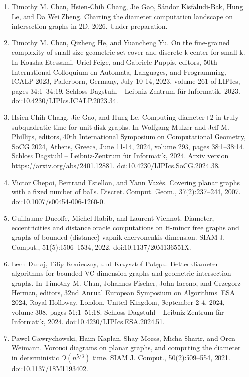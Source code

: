 \begin{enumerate}
\item[]  [9]  Timothy M. Chan, Hsien-Chih Chang, Jie Gao, Sándor Kisfaludi-Bak, Hung Le, and Da Wei Zheng.  Charting the diameter computation landscape on intersection graphs in 2D, 2026.  Under preparation.  
\item[]  [10]  Timothy M. Chan, Qizheng He, and Yuancheng Yu.  On the fine-grained complexity of small-size geometric set cover and discrete k-center for small k.  In Kousha Etessami, Uriel Feige, and Gabriele Puppis, editors, 50th International Colloquium on Automata, Languages, and Programming, ICALP 2023, Paderborn, Germany, July 10-14, 2023, volume 261 of LIPIcs, pages 34:1–34:19. Schloss Dagstuhl – Leibniz-Zentrum für Informatik, 2023.  doi:10.4230/LIPIcs.ICALP.2023.34.  
\item[]  [11]  Hsien-Chih Chang, Jie Gao, and Hung Le.  Computing diameter+2 in truly-subquadratic time for unit-disk graphs.  In Wolfgang Mulzer and Jeff M. Phillips, editors, 40th International Symposium on Computational Geometry, SoCG 2024, Athens, Greece, June 11-14, 2024, volume 293, pages 38:1–38:14. Schloss Dagstuhl – Leibniz-Zentrum für Informatik, 2024.  Arxiv version https://arxiv.org/abs/2401.12881.  doi:10.4230/LIPIcs.SoCG.2024.38.  
\item[]  [12]  Victor Chepoi, Bertrand Estellon, and Yann Vaxès.  Covering planar graphs with a fixed number of balls.  Discret. Comput. Geom., 37(2):237–244, 2007.  doi:10.1007/s00454-006-1260-0.  
\item[]  [13]  Guillaume Ducoffe, Michel Habib, and Laurent Viennot.  Diameter, eccentricities and distance oracle computations on H-minor free graphs and graphs of bounded (distance) vapnik-chervonenkis dimension.  SIAM J. Comput., 51(5):1506–1534, 2022.  doi:10.1137/20M136551X.  
\item[]  [14]  Lech Duraj, Filip Konieczny, and Krzysztof Potępa.  Better diameter algorithms for bounded VC-dimension graphs and geometric intersection graphs.  In Timothy M. Chan, Johannes Fischer, John Iacono, and Grzegorz Herman, editors, 32nd Annual European Symposium on Algorithms, ESA 2024, Royal Holloway, London, United Kingdom, September 2-4, 2024, volume 308, pages 51:1–51:18. Schloss Dagstuhl – Leibniz-Zentrum für Informatik, 2024.  doi:10.4230/LIPIcs.ESA.2024.51.  
\item[]  [15]  Paweł Gawrychowski, Haim Kaplan, Shay Mozes, Micha Sharir, and Oren Weimann.  Voronoi diagrams on planar graphs, and computing the diameter in deterministic $\tilde{O}(n^{5/3})$ time.  SIAM J. Comput., 50(2):509–554, 2021.  doi:10.1137/18M1193402.  

\end{enumerate}
